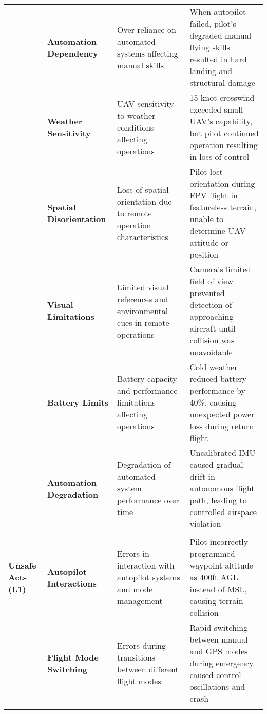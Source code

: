 \begin{table*}[!htbp]
\begin{adjustbox}{width=\textwidth,center}
\begin{threeparttable}
\begin{tabular}{@{}p{2.0cm}p{3.5cm}p{5.0cm}p{4.5cm}@{}}
& \textbf{Automation Dependency}
& Over-reliance on automated systems affecting manual skills
& When autopilot failed, pilot's degraded manual flying skills resulted in hard landing and structural damage \\
\addlinespace[0.2ex]

& \textbf{Weather Sensitivity}
& UAV sensitivity to weather conditions affecting operations
& 15-knot crosswind exceeded small UAV's capability, but pilot continued operation resulting in loss of control \\
\addlinespace[0.2ex]

& \textbf{Spatial Disorientation}
& Loss of spatial orientation due to remote operation characteristics
& Pilot lost orientation during FPV flight in featureless terrain, unable to determine UAV attitude or position \\
\addlinespace[0.2ex]

& \textbf{Visual Limitations}
& Limited visual references and environmental cues in remote operations
& Camera's limited field of view prevented detection of approaching aircraft until collision was unavoidable \\
\addlinespace[0.2ex]

& \textbf{Battery Limits}
& Battery capacity and performance limitations affecting operations
& Cold weather reduced battery performance by 40\%, causing unexpected power loss during return flight \\
\addlinespace[0.2ex]

& \textbf{Automation Degradation}
& Degradation of automated system performance over time
& Uncalibrated IMU caused gradual drift in autonomous flight path, leading to controlled airspace violation \\
\midrule

\rowcolor{red!10}
\multicolumn{4}{c}{\textbf{Level 1: Unsafe Acts (4 patterns)}} \\
\midrule

\textbf{Unsafe Acts (L1)}
& \textbf{Autopilot Interactions}
& Errors in interaction with autopilot systems and mode management
& Pilot incorrectly programmed waypoint altitude as 400ft AGL instead of MSL, causing terrain collision \\
\addlinespace[0.2ex]

& \textbf{Flight Mode Switching}
& Errors during transitions between different flight modes
& Rapid switching between manual and GPS modes during emergency caused control oscillations and crash \\
\addlinespace[0.2ex]


\end{tabular}
\end{threeparttable}
\end{adjustbox}
\end{table*}
